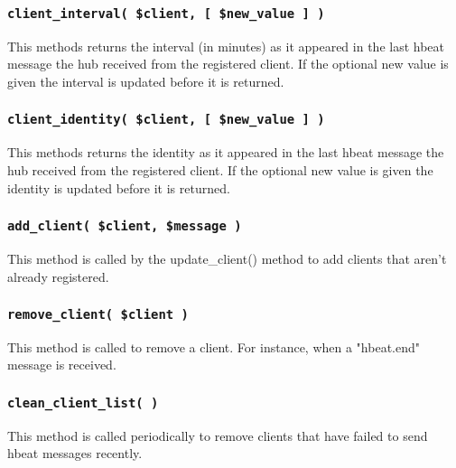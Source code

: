 \documentclass[12pt,a4paper]{article}
\begin{document}
\subsubsection*{\texttt{client\_interval( \$client, [ \$new\_value ] )}\label{xPL::Hub_client_interval_client_new_value_}}


This methods returns the interval (in minutes) as it appeared in the
last hbeat message the hub received from the registered client.  If
the optional new value is given the interval is updated before it is
returned.

\subsubsection*{\texttt{client\_identity( \$client, [ \$new\_value ] )}\label{xPL::Hub_client_identity_client_new_value_}}


This methods returns the identity as it appeared in the last hbeat
message the hub received from the registered client.  If the optional
new value is given the identity is updated before it is returned.

\subsubsection*{\texttt{add\_client( \$client, \$message )}\label{xPL::Hub_add_client_client_message_}}


This method is called by the \textsf{update\_client()} method to add clients
that aren't already registered.

\subsubsection*{\texttt{remove\_client( \$client )}\label{xPL::Hub_remove_client_client_}}


This method is called to remove a client.  For instance, when a "hbeat.end"
message is received.

\subsubsection*{\texttt{clean\_client\_list( )}\label{xPL::Hub_clean_client_list_}}


This method is called periodically to remove clients that have failed
to send hbeat messages recently.
\end{document}
